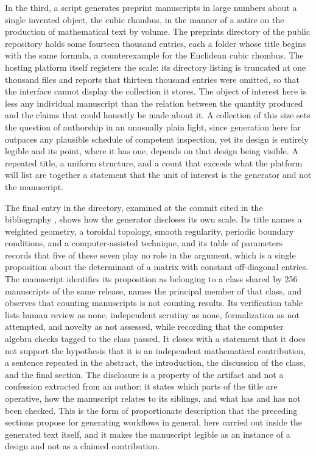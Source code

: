 \documentclass[12pt]{article}
\begin{document}
In the third, a script generates preprint manuscripts in large numbers about a single invented object, the cubic rhombus, in the manner of a satire on the production of mathematical text by volume. The preprints directory of the public repository holds some fourteen thousand entries, each a folder whose title begins with the same formula, a counterexample for the Euclidean cubic rhombus. The hosting platform itself registers the scale: its directory listing is truncated at one thousand files and reports that thirteen thousand entries were omitted, so that the interface cannot display the collection it stores. The object of interest here is less any individual manuscript than the relation between the quantity produced and the claims that could honestly be made about it. A collection of this size sets the question of authorship in an unusually plain light, since generation here far outpaces any plausible schedule of competent inspection, yet its design is entirely legible and its point, where it has one, depends on that design being visible. A repeated title, a uniform structure, and a count that exceeds what the platform will list are together a statement that the unit of interest is the generator and not the manuscript.

The final entry in the directory, examined at the commit cited in the bibliography \cite{cubicrhombus}, shows how the generator discloses its own scale. Its title names a weighted geometry, a toroidal topology, smooth regularity, periodic boundary conditions, and a computer-assisted technique, and its table of parameters records that five of these seven play no role in the argument, which is a single proposition about the determinant of a matrix with constant off-diagonal entries. The manuscript identifies its proposition as belonging to a class shared by 256 manuscripts of the same release, names the principal member of that class, and observes that counting manuscripts is not counting results. Its verification table lists human review as none, independent scrutiny as none, formalization as not attempted, and novelty as not assessed, while recording that the computer algebra checks tagged to the class passed. It closes with a statement that it does not support the hypothesis that it is an independent mathematical contribution, a sentence repeated in the abstract, the introduction, the discussion of the class, and the final section. The disclosure is a property of the artifact and not a confession extracted from an author: it states which parts of the title are operative, how the manuscript relates to its siblings, and what has and has not been checked. This is the form of proportionate description that the preceding sections propose for generating workflows in general, here carried out inside the generated text itself, and it makes the manuscript legible as an instance of a design and not as a claimed contribution.
\end{document}
